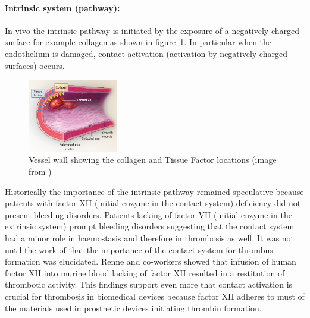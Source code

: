 \documentclass[%
 nofootinbib,
 amsmath,amssymb,
 aps,
 pra,
]{revtex4-1}
\begin{document}
\paragraph{\underline{Intrinsic system (pathway):}}
In vivo the intrinsic pathway is initiated by the exposure of a negatively charged surface for example collagen as shown in figure~\ref{sec:fur}. In particular when the endothelium is damaged, contact activation (activation by negatively charged surfaces) occurs.\\ 
\begin{figure}[h!]
\includegraphics[width=0.35\textwidth]{Figures/Furie.png}
\caption{\label{sec:fur} Vessel wall showing the collagen and Tissue Factor locations (image from \citet{Furie:2008})}
\end{figure}
Historically the importance of the intrinsic pathway remained speculative because patients with factor XII (initial enzyme in the contact system) deficiency did not present bleeding disorders. Patients lacking of factor VII (initial enzyme in the extrinsic system) prompt bleeding disorders suggesting that the contact system had a minor role in haemostasis and therefore in thrombosis as well. It was not until the work of \citet{Renne:2005} that the importance of the contact system for thrombus formation was elucidated. Renne and co-workers showed that infusion of human factor XII into murine blood lacking of factor XII resulted in a restitution of thrombotic activity. This findings support even more that contact activation is crucial for thrombosis in biomedical devices because factor XII adheres to must of the materials used in prosthetic devices initiating thrombin formation.\\
\end{document}
